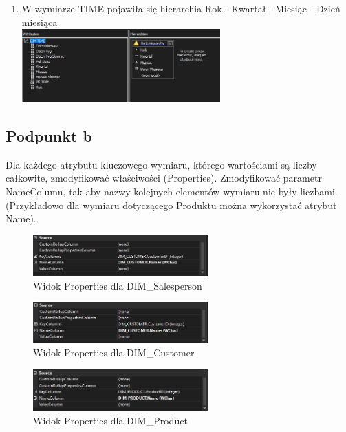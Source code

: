 \documentclass[a4paper,12pt]{article}
\begin{document}
\begin{enumerate}
  \item W wymiarze TIME pojawiła się hierarchia Rok - Kwartał - Miesiąc - Dzień miesiąca\\
        \includegraphics[width=0.6\textwidth]{images/1a5.png}
\end{enumerate}

\subsection{Podpunkt b}

Dla każdego atrybutu kluczowego wymiaru, którego wartościami są liczby całkowite,
zmodyfikować właściwości (Properties). Zmodyfikować parametr NameColumn, tak
aby nazwy kolejnych elementów wymiaru nie były liczbami. (Przykładowo dla wymiaru dotyczącego Produktu można wykorzystać atrybut Name).

\begin{figure}[H]
  \includegraphics[width=0.6\textwidth]{images/1b_salesperson.png}
  \caption{Widok Properties dla DIM\_Salesperson}
\end{figure}

\begin{figure}[H]
  \includegraphics[width=0.6\textwidth]{images/1b_customer.png}
  \caption{Widok Properties dla DIM\_Customer}
\end{figure}

\begin{figure}[H]
  \includegraphics[width=0.6\textwidth]{images/1b_product.png}
  \caption{Widok Properties dla DIM\_Product}
\end{figure}
\end{document}
